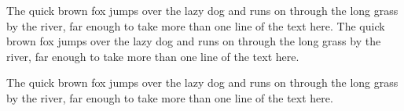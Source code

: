 \documentclass[11pt]{article}
\begin{document}
The quick brown fox jumps over the lazy dog and runs on through the long grass by the river, far enough to take more than one line of the text here. \footnotesize The quick brown fox jumps over the lazy dog and runs on through the long grass by the river, far enough to take more than one line of the text here.

The quick brown fox jumps over the lazy dog and runs on through the long grass by the river, far enough to take more than one line of the text here.
\end{document}

